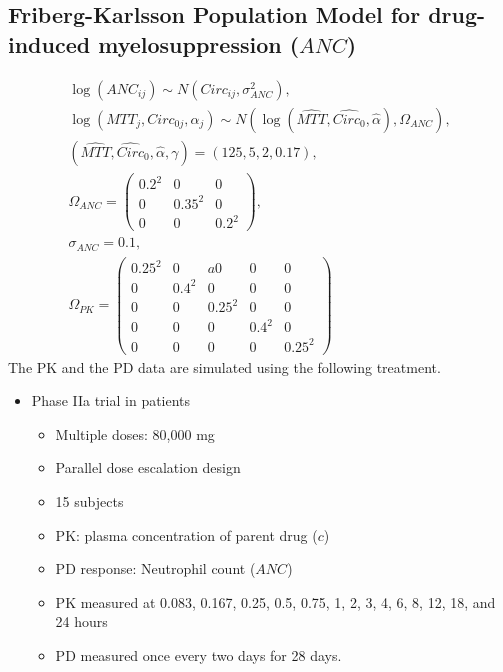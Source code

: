 \documentclass[12pt, reqno, oneside]{amsbook}
\numberwithin{equation}{chapter}
\numberwithin{figure}{chapter}
\numberwithin{table}{chapter}
\theoremstyle{remark}
\begin{document}
\subsection{Friberg-Karlsson Population Model for drug-induced myelosuppression (\(ANC\))}
\label{sec:org1cc1dab}
\begin{gather*}
\log(ANC_{ij}) \sim N(Circ_{ij}, \sigma^2_{ANC}), \\
\log\left(MTT_j, Circ_{0j}, \alpha_j\right) \sim N\left(\log\left(\widehat{MTT}, \widehat{Circ_0}, \widehat{\alpha}\right), \Omega_{ANC}\right), \\
\left(\widehat{MTT}, \widehat{Circ}_0,\widehat{\alpha}, \gamma \right) = \left(125, 5, 2, 0.17\right), \\
\Omega_{ANC} = \left(\begin{array}{ccc} 0.2^2 & 0 & 0 \\ 0 & 0.35^2 & 0 \\ 0 & 0 & 0.2^2 \end{array}\right), \\
\sigma_{ANC} = 0.1, \\
\Omega_{PK} = \left(\begin{array}{ccccc} 0.25^2 & 0 &a 0 & 0 & 0 \\ 0 & 0.4^2 & 0 & 0 & 0 \\
0 & 0 & 0.25^2 & 0 & 0 \\ 0 & 0 & 0 & 0.4^2 & 0 \\ 0 & 0 & 0 & 0 & 0.25^2  \end{array}\right)
\end{gather*}
The PK and the PD data are simulated using the following treatment.
\begin{itemize}
\item Phase IIa trial in patients
\begin{itemize}
\item Multiple doses: 80,000 mg
\item Parallel dose escalation design
\item 15 subjects
\item PK: plasma concentration of parent drug (\(c\))
\item PD response: Neutrophil count (\(ANC\))
\item PK measured at 0.083, 0.167, 0.25, 0.5, 0.75, 1, 2, 3, 4, 6, 8, 12, 18, and 24 hours
\item PD measured once every two days for 28 days.
\end{itemize}
\end{itemize}
\end{document}
